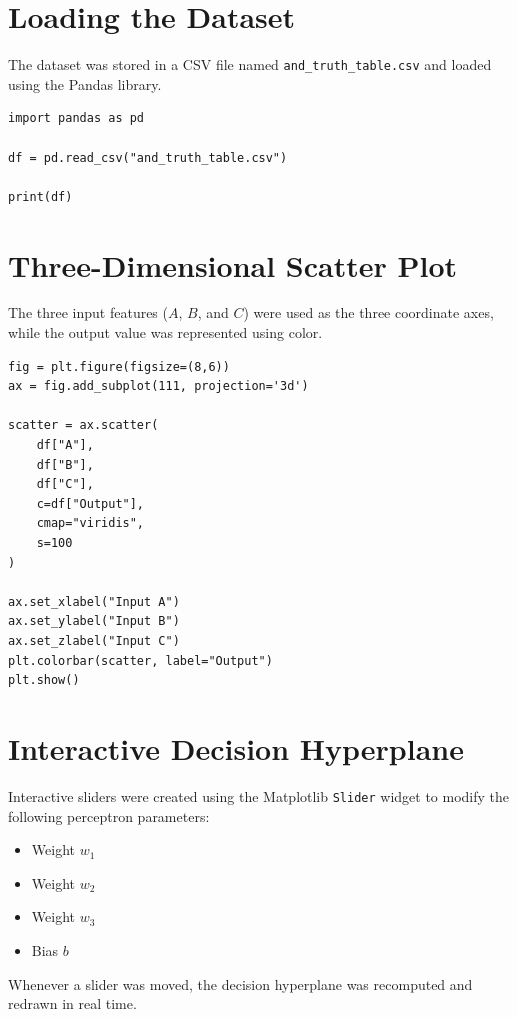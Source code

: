 \documentclass[12pt]{article}
\begin{document}
\section{Loading the Dataset}

The dataset was stored in a CSV file named \texttt{and\_truth\_table.csv} and loaded using the Pandas library.

\begin{lstlisting}[caption=Loading the Dataset]
import pandas as pd

df = pd.read_csv("and_truth_table.csv")

print(df)
\end{lstlisting}

\section{Three-Dimensional Scatter Plot}

The three input features ($A$, $B$, and $C$) were used as the three coordinate axes, while the output value was represented using color.

\begin{lstlisting}[caption=Creating the 3D Scatter Plot]
fig = plt.figure(figsize=(8,6))
ax = fig.add_subplot(111, projection='3d')

scatter = ax.scatter(
    df["A"],
    df["B"],
    df["C"],
    c=df["Output"],
    cmap="viridis",
    s=100
)

ax.set_xlabel("Input A")
ax.set_ylabel("Input B")
ax.set_zlabel("Input C")
plt.colorbar(scatter, label="Output")
plt.show()
\end{lstlisting}

\section{Interactive Decision Hyperplane}

Interactive sliders were created using the Matplotlib \texttt{Slider} widget to modify the following perceptron parameters:

\begin{itemize}
    \item Weight $w_1$
    \item Weight $w_2$
    \item Weight $w_3$
    \item Bias $b$
\end{itemize}

Whenever a slider was moved, the decision hyperplane was recomputed and redrawn in real time.
\end{document}

